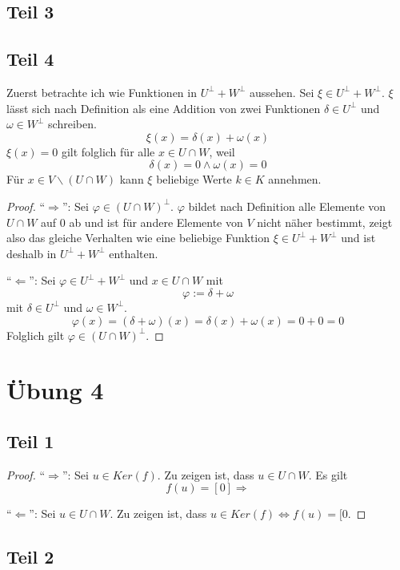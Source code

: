 \documentclass[a4paper,10pt]{article}
\begin{document}
\subsection*{Teil 3}

\subsection*{Teil 4}

Zuerst betrachte ich wie Funktionen in $U^\perp + W^\perp$ aussehen.
Sei $\xi \in U^\perp + W^\perp$.
$\xi$ lässt sich nach Definition als eine Addition von zwei Funktionen $\delta \in U^\perp$ und $\omega \in W^\perp$ schreiben.
\begin{equation}
 \xi(x) = \delta(x) + \omega(x)
\end{equation}
$\xi(x) = 0$ gilt folglich für alle $x \in U \cap W$, weil
\begin{equation}
 \delta(x) = 0 \land \omega(x) = 0
\end{equation}
Für $x \in V \backslash (U \cap W)$ kann $\xi$ beliebige Werte $k \in K$ annehmen.

\begin{proof}
 ``$\Rightarrow$'': Sei $\varphi \in (U \cap W)^\perp$.
 $\varphi$ bildet nach Definition alle Elemente von $U \cap W$ auf $0$ ab und ist für andere Elemente von $V$ nicht näher bestimmt, zeigt also das gleiche Verhalten wie eine beliebige Funktion $\xi \in U^\perp + W^\perp$ und ist deshalb in $U^\perp + W^\perp$ enthalten.
 
 ``$\Leftarrow$'': Sei $\varphi \in U^\perp + W^\perp$ und $x \in U \cap W$ mit
 \begin{equation}
  \varphi := \delta + \omega
 \end{equation}
 mit $\delta \in U^\perp$ und $\omega \in W^\perp$.
 \begin{equation}
  \varphi(x) = (\delta + \omega)(x) = \delta(x) + \omega(x) = 0 + 0 = 0
 \end{equation}
 Folglich gilt $\varphi \in (U \cap W)^\perp$.
\end{proof}

\section*{Übung 4}

\subsection*{Teil 1}

\begin{proof}
 ``$\Rightarrow$'': Sei $u \in Ker(f)$.
 Zu zeigen ist, dass $u \in U \cap W$.
 Es gilt
 \begin{equation}
  f(u) = [0] \Rightarrow 
 \end{equation}

 
 ``$\Leftarrow$'': Sei $u \in U \cap W$.
 Zu zeigen ist, dass $u \in Ker(f) \Leftrightarrow f(u) = [0$.
 
\end{proof}

\subsection*{Teil 2}
\end{document}
